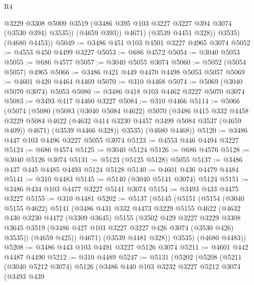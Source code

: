 \begin{lexlean}{R4}
\begin{coremodule}
                @3229
                @3308
                @5009
                @3519
                (@3486 @395 @103 @3227 @3227 @394 @3074 (@3530 @394) @3535))
              (@4659 @393))
            @4671)
          (@3539 @4451 @328))
        @3535)
      (@4680 @4453))
@5049 := @3486 @451 @103 @4501 @3227 @4965 @3074
@5052 := @4553 @450 @4499 @3227
@5053 := @686 @4572
@5054 := @3040 @5053
@5055 := @686 @4577
@5057 := @3040 @5055 @3074
@5060 := @5052 (@5054 @5057) @4965
@5066 := @3486 @421 @449 @4470 @4498 @5053 @5057
@5069 := @4601 @420 @4464 @4469
@5070 := @310 @4468
@5074 := @5069 (@3040 @5070 @3074) @5053
@5080 := @3486 @418 @103 @4462 @3227 @5070 @3074
@5083 := @3493 @417 @4460 @3227
@5084 := @310 @4466
@5114 := @5066
    (@5074
      (@5080
        (@5083
          (@3040 @5084 @4622)
          @5070
          (@3486
            @415
            @332
            @4458
            @3229
            @5084
            @4622
            (@4632 @414 @3230 @4457 @3499 @5084 @3537 (@4659 @409))
            @4671)
          (@3539 @4466 @328))
        @3535)
      (@4680 @4468))
@5120 := @3486 @447 @103 @4496 @3227 @5055 @3074
@5123 := @4553 @446 @4494 @3227
@5124 := @686 @4574
@5125 := @3040 @5124
@5126 := @686 @4576
@5128 := @3040 @5126 @3074
@5131 := @5123 (@5125 @5128) @5055
@5137 := @3486 @437 @445 @4485 @4493 @5124 @5128
@5140 := @4601 @436 @4479 @4484
@5141 := @310 @4483
@5145 := @5140 (@3040 @5141 @3074) @5124
@5151 := @3486 @434 @103 @4477 @3227 @5141 @3074
@5154 := @3493 @433 @4475 @3227
@5155 := @310 @4481
@5202 := @5137
    (@5145
      (@5151
        (@5154
          (@3040 @5155 @4622)
          @5141
          (@3486
            @431
            @332
            @4473
            @3229
            @5155
            @4622
            (@4632
              @430
              @3230
              @4472
              (@3309 @3645)
              @5155
              (@3502
                @429
                @3227
                @3229
                @3308
                @3645
                @3519
                (@3486 @427 @103 @3227 @3227 @426 @3074 (@3530 @426) @3535))
              (@4659 @425))
            @4671)
          (@3539 @4481 @328))
        @3535)
      (@4680 @4483))
@5208 := @3486 @443 @103 @4491 @3227 @5126 @3074
@5211 := @4601 @442 @4487 @4490
@5212 := @310 @4489
@5247 := @5131
    (@5202
      (@5208
        (@5211
          (@3040 @5212 @3074)
          @5126
          (@3486
            @440
            @103
            @3232
            @3227
            @5212
            @3074
            (@3493
              @439

\end{coremodule}
\end{lexlean}
